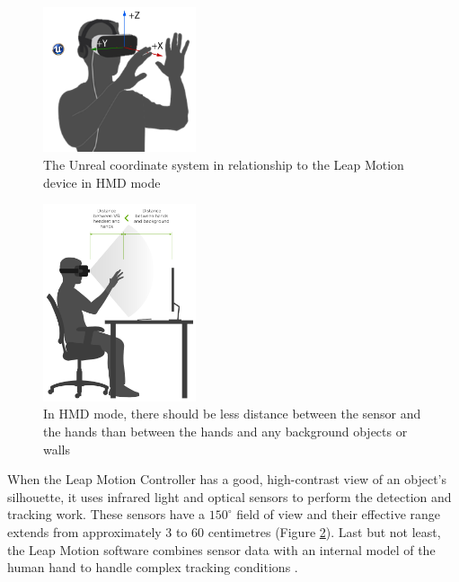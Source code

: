 \begin{figure}[!htb]
\includegraphics[width=0.4\textwidth]{figures/unrealAxes.png}
\centering
\caption{The Unreal coordinate system in relationship to the Leap Motion device in HMD mode \cite{ULTP}}
\label{fig:unrealAxes}
\end{figure}

\begin{figure}[!htb]
\includegraphics[width=0.4\textwidth]{figures/HMDistance.png}
\centering
\caption{In HMD mode, there should be less distance between the sensor and the hands than between the hands and any background objects or walls \cite{ULTP}}
\label{fig:HMDistance}
\end{figure}

When the Leap Motion Controller has a good, high-contrast view of an object's silhouette, it uses infrared light and optical sensors to perform the detection and tracking work. These sensors have a $150^\circ$ field of view and their effective range extends from approximately 3 to 60 centimetres (Figure \ref{fig:HMDistance}). Last but not least, the Leap Motion software combines sensor data with an internal model of the human hand to handle complex tracking conditions \cite{ULTP}.

